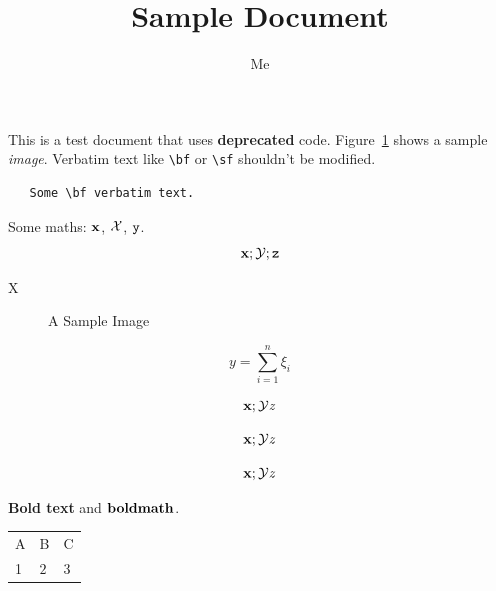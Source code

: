 \documentclass[12pt,a4paper]{article}
\title{Sample Document}
\author{Me}
\newcommand{\boldstuff}[1]{{\bf #1}}
\begin{document}
\maketitle

This is a test {\sf document} that uses {\bf  deprecated} code.
Figure~\ref{fig:sample} shows a sample {\it image}.
  Verbatim text like \verb|\bf| or \verb|\sf| shouldn't be
modified. 
\begin{verbatim}
   Some \bf verbatim text.
\end{verbatim}

Some maths: $\bf x$, \begin{math}\cal X\end{math},
\(\tt y\).
\[
  {\bf x}; {\cal Y}; {\tt z}
\]

   \centerline{X}

\begin{figure}
\centerline{}
\caption{A Sample Image}
\label{fig:sample}
\end{figure}

$$y = \sum_{i=1}^n \xi_i$$

$${\bf x}; {\cal Y} {\it z}$$

\begin{displaymath}
{\bf x}; {\cal Y} {\it z}
\end{displaymath}

\begin{equation}
{\bf x}; {\cal Y} {\it z}
\end{equation}


\boldstuff{Bold text} and $\boldstuff{bold math}$.

\begin{table}
{\begin{tabular}{lll}
 A & B & C\\
 1 & $2$ & 3
 \end{tabular}
}
\end{table}
\end{document}
